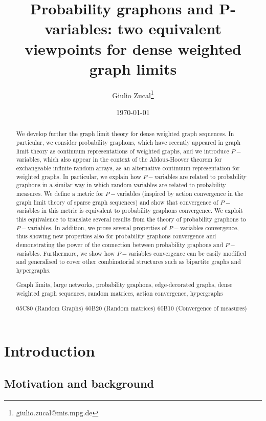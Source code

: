 \documentclass[11pt]{article}
\title{Probability graphons and P-variables: two equivalent viewpoints for dense weighted graph limits}
\author{Giulio Zucal\thanks{giulio.zucal@mis.mpg.de}}
\affil[1]{Max Planck Institute for Mathematics in the Sciences, Leipzig, Germany}
\date{\today}
\begin{document}
\maketitle

\begin{abstract}
We develop further the graph limit theory for dense weighted graph sequences. In particular, we consider probability graphons, which have recently appeared in graph limit theory as continuum representations of weighted graphs, and we introduce $P-$variables, which also appear in the context of the Aldous-Hoover theorem for exchangeable infinite random arrays, as an alternative continuum representation for weighted graphs. In particular, we explain how $P-$variables are related to probability graphons in a similar way in which random variables are related to probability measures. We define a metric for $P-$variables (inspired by action convergence in the graph limit theory of sparse graph sequences) and show that convergence of $P-$variables in this metric is equivalent to probability graphons convergence. We exploit this equivalence to translate several results from the theory of probability graphons to $P-$variables. In addition, we prove several properties of $P-$variables convergence, thus showing new properties also for probability graphons convergence and demonstrating the power of the connection between probability graphons and $P-$variables. Furthermore, we show how $P-$variables convergence can be easily modified and generalised to cover other combinatorial structures such as bipartite graphs and hypergraphs. 




    \vspace{0.2cm}
  Graph limits, large networks, probability graphons, edge-decorated graphs, dense weighted graph sequences, random matrices, action convergence, hypergraphs

    \vspace{0.2cm}
  05C80 (Random Graphs)   60B20 (Random matrices) 60B10 (Convergence of measures)
\end{abstract}

\section{Introduction}
\subsection{Motivation and background}
\end{document}
